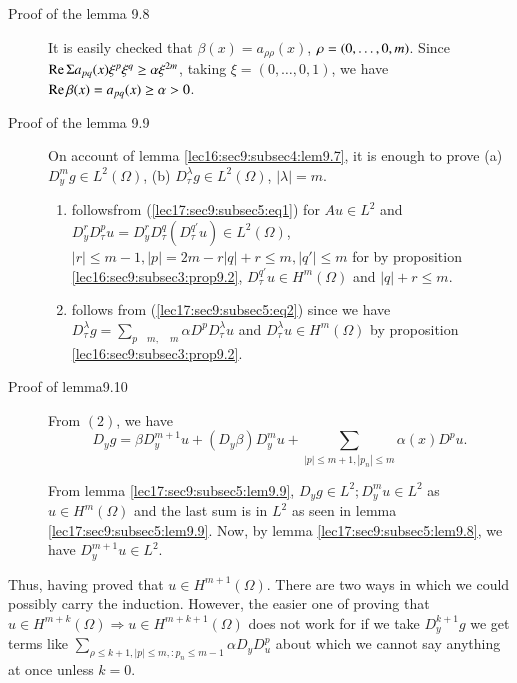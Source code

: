\begin{description}
  \item [Proof of the lemma 9.8]%
  It is easily checked that $\beta (x) = a_{\rho \rho} (x)$, $\rho = (0,
  \ldots,\break 0, m)$. Since $\operatorname{Re} \Sigma a_{pq}(x) \xi^p \xi^q \geq \alpha
  \xi^{2m}$, taking $\xi = (0, \ldots , 0, 1)$, we have $\operatorname{Re}  \beta (x)
  = a_{pq} (x) \geq \alpha > 0$.  
\item [Proof of the lemma 9.9] %
    On account of lemma \ref{lec16:sec9:subsec4:lem9.7}, it is enough to prove (a) $D^m_y g 
    \in L^2 (\Omega )$, (b) $D^\lambda_\tau g \in L^2
    (\Omega )$, $| \lambda | = m$.  
  
  \begin{enumerate}[\rm a)]
  \item follows\pageoriginale from (\ref{lec17:sec9:subsec5:eq1}) for $Au \in L^2$ and $D^r_y D^p_\tau
    u = D^r_y D^q_\tau (D^{q'}_\tau u ) \in L^2 (\Omega )$, $|r|
    \leq m-1, |p| = 2m-r |q|+ r \leq m, |q'| \leq m$ 
    for by proposition \ref{lec16:sec9:subsec3:prop9.2}, $D^{q'}_\tau u \in H^m
    (\Omega)$ and $| q | + r \leq m$.  
  \item follows from (\ref{lec17:sec9:subsec5:eq2}) since we have $D^\lambda _\tau g =
    \sum\limits_{p \quad m, \quad m} \alpha D^p D^\lambda_\tau u$ and
    $D^\lambda_\tau u \in H^m ( \Omega )$ by proposition \ref{lec16:sec9:subsec3:prop9.2}.  
  \end{enumerate}
\item [Proof of lemma9.10] %
    From $(2)$, we have 
    $$
    D_y g = \beta D^{m+1}_y u + (D_y \beta ) D^m_y u + \sum\limits_{| p |
      \leq m+1, | p_n | \leq m} \alpha (x) D^p u.  
    $$

    From lemma \ref{lec17:sec9:subsec5:lem9.9}, $D_y g \in L^2; D^m_y u \in L^2$ as
    $u \in H^m (\Omega )$ and the last sum is in $L^2$ as seen in
    lemma \ref{lec17:sec9:subsec5:lem9.9}. Now, by lemma 
    \ref{lec17:sec9:subsec5:lem9.8}, we have $D^{m+1}_y u \in L^2$.  
\end{description}

Thus, having proved that $u \in H^{m+1} (\Omega )$. There are
two ways in which we could possibly carry the induction. However, the
easier one of proving that $u \in H^{m+k} (\Omega )
\Rightarrow u \in H^{m+k+1} (\Omega )$ does not work for if we
take $D^{k+1}_y g$ we get terms like $\sum\limits_{\rho \leq k+1,| p |
  \leq m, :p_n \leq m-1} \alpha D_y D^p_u$ about which we
cannot say anything at once unless $k = 0$.  

